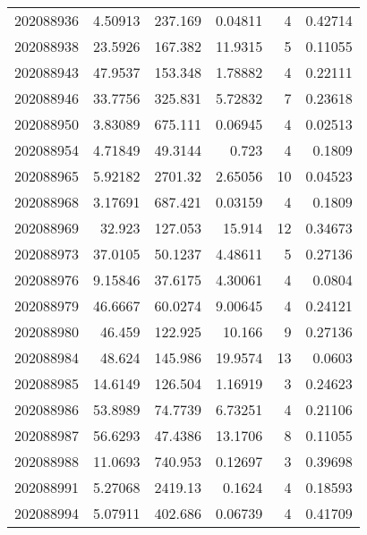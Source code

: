 \begin{tabular}{rrrrrr}
 202088936 &          4.50913 &      237.169  &            0.04811 &           4 & 0.42714 \\
 202088938 &         23.5926  &      167.382  &           11.9315  &           5 & 0.11055 \\
 202088943 &         47.9537  &      153.348  &            1.78882 &           4 & 0.22111 \\
 202088946 &         33.7756  &      325.831  &            5.72832 &           7 & 0.23618 \\
 202088950 &          3.83089 &      675.111  &            0.06945 &           4 & 0.02513 \\
 202088954 &          4.71849 &       49.3144 &            0.723   &           4 & 0.1809  \\
 202088965 &          5.92182 &     2701.32   &            2.65056 &          10 & 0.04523 \\
 202088968 &          3.17691 &      687.421  &            0.03159 &           4 & 0.1809  \\
 202088969 &         32.923   &      127.053  &           15.914   &          12 & 0.34673 \\
 202088973 &         37.0105  &       50.1237 &            4.48611 &           5 & 0.27136 \\
 202088976 &          9.15846 &       37.6175 &            4.30061 &           4 & 0.0804  \\
 202088979 &         46.6667  &       60.0274 &            9.00645 &           4 & 0.24121 \\
 202088980 &         46.459   &      122.925  &           10.166   &           9 & 0.27136 \\
 202088984 &         48.624   &      145.986  &           19.9574  &          13 & 0.0603  \\
 202088985 &         14.6149  &      126.504  &            1.16919 &           3 & 0.24623 \\
 202088986 &         53.8989  &       74.7739 &            6.73251 &           4 & 0.21106 \\
 202088987 &         56.6293  &       47.4386 &           13.1706  &           8 & 0.11055 \\
 202088988 &         11.0693  &      740.953  &            0.12697 &           3 & 0.39698 \\
 202088991 &          5.27068 &     2419.13   &            0.1624  &           4 & 0.18593 \\
 202088994 &          5.07911 &      402.686  &            0.06739 &           4 & 0.41709 \\

\end{tabular}
